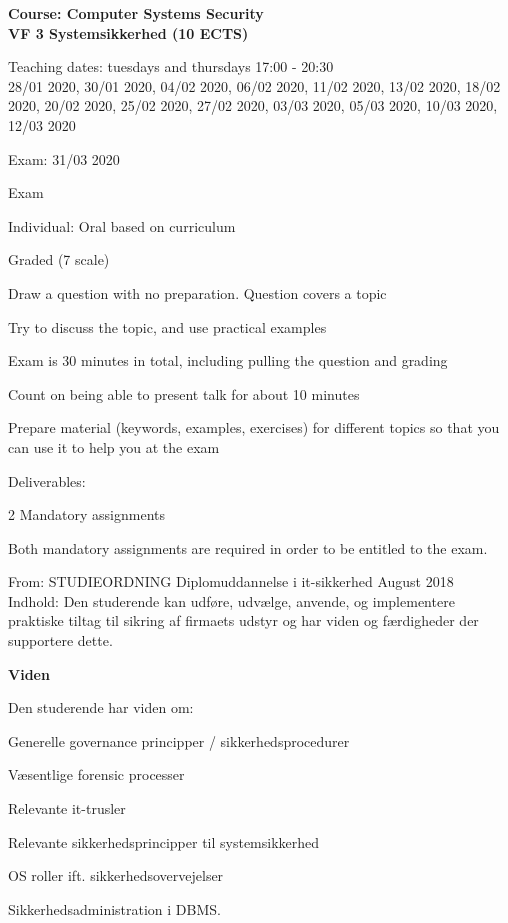 \documentclass[Screen16to9,17pt]{foils}
\begin{document}




{\Large\bf Course: Computer Systems Security\\
VF 3 Systemsikkerhed (10 ECTS)}

Teaching dates: tuesdays and thursdays 17:00 - 20:30\\
28/01 2020, 30/01 2020, 04/02 2020, 06/02 2020, 11/02 2020, 13/02 2020, 18/02 2020, 20/02 2020, 25/02 2020, 27/02 2020, 03/03 2020, 05/03 2020, 10/03 2020, 12/03 2020

Exam: 31/03 2020


\begin{list2}
\item Exam
\item Individual: Oral based on curriculum
\item Graded (7 scale)
\item Draw a question with no preparation. Question covers a topic
\item Try to discuss the topic, and use practical examples
\item Exam is 30 minutes in total, including pulling the question and grading
\item Count on being able to present talk for about 10 minutes
\item Prepare material (keywords, examples, exercises) for different topics so that you can use it to help you at the exam

\vskip 5mm
\item Deliverables:
\item 2 Mandatory assignments
\item Both mandatory assignments are required in order to be entitled to the exam.
\end{list2}



From: STUDIEORDNING Diplomuddannelse i it-sikkerhed August 2018\\
Indhold: Den studerende kan udføre, udvælge, anvende, og implementere praktiske
tiltag til sikring af firmaets udstyr og har viden og færdigheder der supportere dette.

{\bf Viden}

Den studerende har viden om:
\begin{list2}
\item Generelle governance principper / sikkerhedsprocedurer
\item Væsentlige forensic processer
\item Relevante it-trusler
\item Relevante sikkerhedsprincipper til systemsikkerhed
\item OS roller ift. sikkerhedsovervejelser
\item Sikkerhedsadministration i DBMS.
\end{list2}
\end{document}
